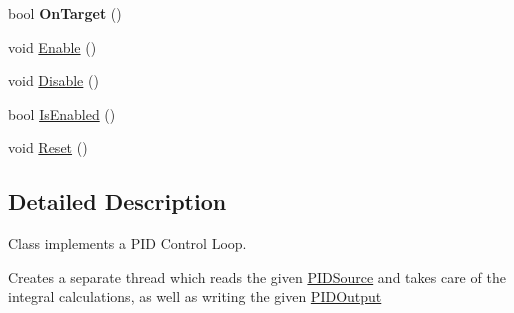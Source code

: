 \begin{DoxyCompactItemize}
\item 
\hypertarget{classPIDController_acee849c5dd29905362aaeb414de5c3ed}{bool {\bfseries \-On\-Target} ()}\label{classPIDController_acee849c5dd29905362aaeb414de5c3ed}

\item 
void \hyperlink{classPIDController_a1b272c08b669b2a86f47958aa839b656}{\-Enable} ()
\item 
void \hyperlink{classPIDController_ad13d5e8f8b465a00ad2c21a14cb832c4}{\-Disable} ()
\item 
bool \hyperlink{classPIDController_a55f228ba275cac683e82bbc48a298842}{\-Is\-Enabled} ()
\item 
void \hyperlink{classPIDController_a7c4b30b19bbcf226f5c6de8df23ec9e9}{\-Reset} ()
\end{DoxyCompactItemize}


\subsection{\-Detailed \-Description}
\-Class implements a \-P\-I\-D \-Control \-Loop.

\-Creates a separate thread which reads the given \hyperlink{classPIDSource}{\-P\-I\-D\-Source} and takes care of the integral calculations, as well as writing the given \hyperlink{classPIDOutput}{\-P\-I\-D\-Output} 

